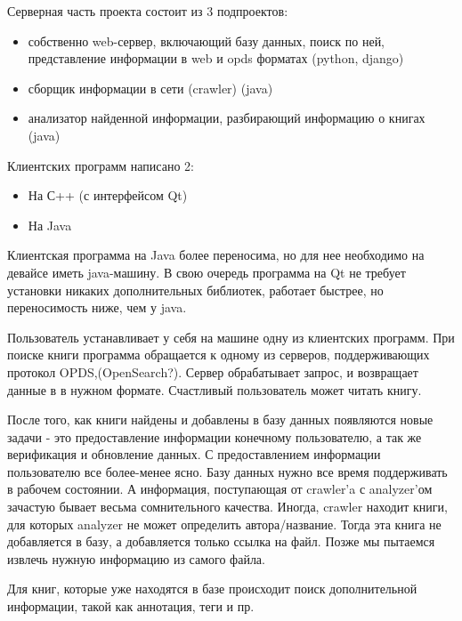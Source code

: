 \documentclass[a4paper]{report}
\begin{document}
Серверная часть проекта состоит из 3 подпроектов:
\begin{itemize}
\item собственно web-сервер, включающий базу данных, поиск по ней, представление информации в web и opds форматах (python, django)
\item сборщик информации в сети (crawler) (java)
\item анализатор найденной информации, разбирающий информацию о книгах (java) 
\end{itemize}
Клиентских программ написано 2:
\begin{itemize}
\item На С++ (с интерфейсом Qt)
\item На Java 
\end{itemize}

Клиентская программа на Java более переносима, но для нее необходимо на девайсе иметь java-машину. В свою очередь программа на Qt не требует установки никаких дополнительных библиотек, работает быстрее, но переносимость ниже, чем у java.
		


Пользователь устанавливает у себя на машине одну из клиентских программ. При поиске книги программа обращается к одному из серверов, поддерживающих протокол OPDS,(OpenSearch?). Сервер обрабатывает запрос, и возвращает данные в в нужном формате. Счастливый пользователь может читать книгу.



После того, как книги найдены и добавлены в базу данных появляются новые задачи - это предоставление информации конечному пользователю, а так же верификация и обновление данных. С предоставлением информации пользователю все более-менее ясно. Базу данных нужно все время поддерживать в рабочем состоянии. А информация, поступающая от crawler'a с analyzer'ом зачастую бывает весьма сомнительного качества. Иногда, crawler находит книги, для которых analyzer не может определить автора/название. Тогда эта книга не добавляется в базу, а добавляется только ссылка на файл. Позже мы пытаемся извлечь нужную информацию из самого файла.

Для книг, которые уже находятся в базе происходит поиск дополнительной информации, такой как аннотация, теги и пр.

\end{document}
